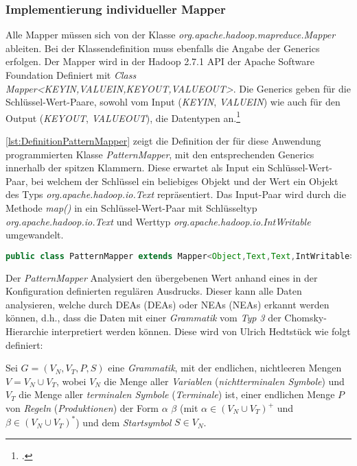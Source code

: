 \subsubsection{Implementierung individueller Mapper}
Alle Mapper müssen sich von der Klasse \textit{org.apache.hadoop.mapreduce.Mapper} ableiten. Bei der Klassendefinition muss ebenfalls die Angabe der \glspl{Generic} erfolgen. Der Mapper wird in der Hadoop 2.7.1 \ac{API} der Apache Software Foundation Definiert mit \textit{Class Mapper<KEYIN,VALUEIN,KEYOUT,VALUEOUT>}. Die \glspl{Generic} geben für die Schlüssel-Wert-Paare, sowohl vom Input (\textit{KEYIN}, \textit{VALUEIN}) wie auch für den Output (\textit{KEYOUT}, \textit{VALUEOUT}), die Datentypen an.\footcite[Vgl.][]{ApacheHadoopApiDokuMapper.2015}

\autoref{lst:DefinitionPatternMapper} zeigt die Definition der für diese Anwendung programmierten Klasse \textit{PatternMapper}, mit den entsprechenden Generics innerhalb der spitzen Klammern. Diese erwartet als Input ein Schlüssel-Wert-Paar, bei welchem der Schlüssel ein beliebiges Objekt und der Wert ein Objekt des Typs \textit{org.apache.hadoop.io.Text} repräsentiert. Das Input-Paar wird durch die Methode \textit{map()} in ein Schlüssel-Wert-Paar mit Schlüsseltyp \textit{org.apache.hadoop.io.Text} und Werttyp \textit{org.apache.hadoop.io.IntWritable} umgewandelt. \\

\begin{lstlisting}[language=Java,caption=Deklaration \textit{PatternMapper} mit Generics,label=lst:DefinitionPatternMapper]
public class PatternMapper extends Mapper<Object,Text,Text,IntWritable>
\end{lstlisting}

Der \textit{PatternMapper} Analysiert den übergebenen Wert anhand eines in der Konfiguration definierten regulären Ausdrucks. Dieser kann alle Daten analysieren, welche durch \aclp{DEA} ({\color{LinkColor}\acsp{DEA}}) oder \aclp{NEA} ({\color{LinkColor}\acsp{NEA}}) erkannt werden können, d.h., dass die Daten mit einer \textit{Grammatik} vom \textit{Typ 3} der Chomsky-Hierarchie interpretiert werden können. Diese wird von Ulrich Hedtstück wie folgt definiert:

Sei $G = (V_N, V_T, P, S)$ eine \textit{Grammatik}, mit der endlichen, nichtleeren Mengen $V = V_N \cup V_T$, wobei $V_N$ die Menge aller \textit{Variablen} (\textit{nichtterminalen Symbole}) und $V_T$ die Menge aller \textit{terminalen Symbole} (\textit{Terminale}) ist, einer endlichen Menge $P$ von \textit{Regeln} (\textit{Produktionen}) der Form $\alpha$ \textrightarrow $\beta$ (mit $\alpha \in (V_N \cup V_T)^+$ und $\beta \in (V_N \cup V_T)^*$) und dem \textit{Startsymbol} $S \in V_N$. 

